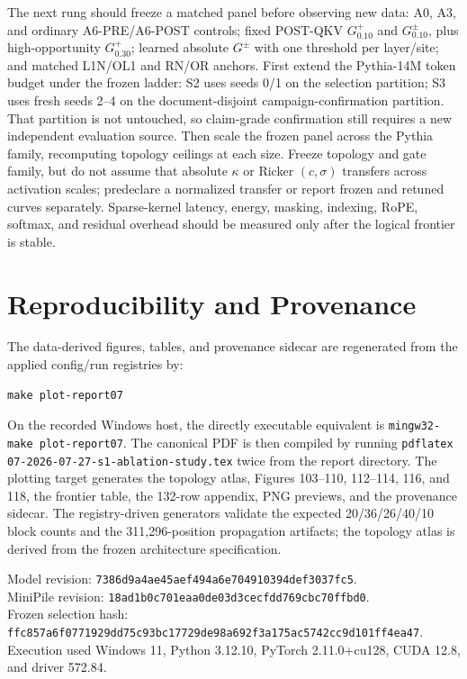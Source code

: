 \documentclass[10pt]{article}
\begin{document}
The next rung should freeze a matched panel before observing new data: A0, A3,
and ordinary A6-PRE/A6-POST controls; fixed POST-QKV \(G^+_{0.10}\) and
\(G^\pm_{0.10}\), plus high-opportunity \(G^+_{0.30}\); learned absolute
\(G^\pm\) with one threshold per layer/site; and matched L1N/OL1 and RN/OR
anchors. First extend the Pythia-14M
token budget under the frozen ladder: S2 uses seeds 0/1 on the selection
partition; S3 uses fresh seeds 2--4 on the document-disjoint
campaign-confirmation partition. That partition is not untouched, so
claim-grade confirmation still requires a new independent evaluation source.
Then scale the frozen panel across the Pythia family, recomputing topology
ceilings at each size. Freeze topology and gate family, but do not assume that
absolute \(\kappa\) or Ricker \((c,\sigma)\) transfers across activation
scales; predeclare a normalized transfer or report frozen and retuned curves
separately. Sparse-kernel latency, energy, masking, indexing, RoPE, softmax,
and residual overhead should be measured only after the logical frontier is
stable.

\section{Reproducibility and Provenance}

The data-derived figures, tables, and provenance sidecar are regenerated from
the applied config/run registries by:
\begin{verbatim}
make plot-report07
\end{verbatim}
On the recorded Windows host, the directly executable equivalent is
\texttt{mingw32-make plot-report07}.
The canonical PDF is then compiled by running
\texttt{pdflatex 07-2026-07-27-s1-ablation-study.tex} twice from the report
directory. The plotting target generates the topology atlas, Figures 103--110,
112--114, 116, and 118, the frontier table, the 132-row appendix, PNG previews,
and the provenance sidecar. The registry-driven generators validate the expected
20/36/26/40/10 block counts and the 311,296-position propagation artifacts;
the topology atlas is derived from the frozen architecture specification.

Model revision:
\texttt{7386d9a4ae45aef494a6e704910394def3037fc5}.\\
MiniPile revision:
\texttt{18ad1b0c701eaa0de03d3cecfdd769cbc70ffbd0}.\\
Frozen selection hash:
\texttt{ffc857a6f0771929dd75c93bc17729de98a692f3a175ac5742cc9d101ff4ea47}.
Execution used Windows 11, Python 3.12.10, PyTorch 2.11.0+cu128, CUDA 12.8,
and driver 572.84.
\end{document}
